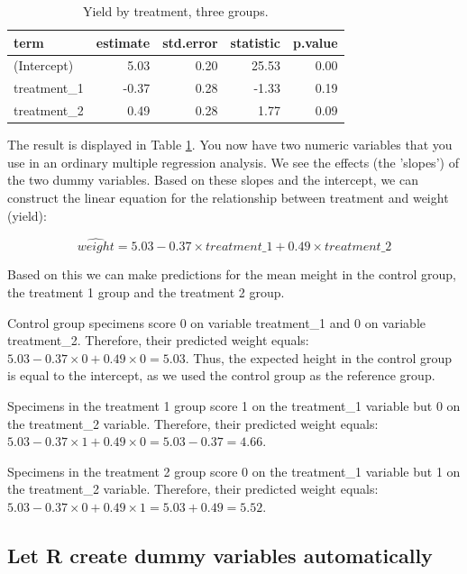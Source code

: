 \documentclass[]{book}\usepackage[]{graphicx}\usepackage[]{color}
\begin{document}
\begin{table}[ht]
\centering
\caption{Yield by treatment, three groups.} 
\label{tab:dummy_11_r}
\begin{tabular}{lrrrr}
  \hline
term & estimate & std.error & statistic & p.value \\ 
  \hline
(Intercept) & 5.03 & 0.20 & 25.53 & 0.00 \\ 
  treatment\_1 & -0.37 & 0.28 & -1.33 & 0.19 \\ 
  treatment\_2 & 0.49 & 0.28 & 1.77 & 0.09 \\ 
   \hline
\end{tabular}
\end{table}



The result is displayed in Table \ref{tab:dummy_11_r}. You now have two numeric variables that you use in an ordinary multiple regression analysis. We see the effects (the 'slopes') of the two dummy variables. Based on these slopes and the intercept, we can construct the linear equation for the relationship between treatment and weight (yield):


\begin{equation}
\widehat{weight} = 5.03 - 0.37 \times treatment\_1 + 0.49 \times treatment\_2
\end{equation}

Based on this we can make predictions for the mean meight in the control group, the treatment 1 group and the treatment 2 group.

Control group specimens score 0 on variable treatment\_1 and 0 on variable treatment\_2. Therefore, their predicted weight equals: $5.03 - 0.37 \times 0 + 0.49 \times 0 =  5.03$. Thus, the expected height in the control group is equal to the intercept, as we used the control group as the reference group.

Specimens in the treatment 1 group score 1 on the treatment\_1 variable but 0 on the treatment\_2 variable. Therefore, their predicted weight equals: $5.03 - 0.37 \times 1 + 0.49 \times 0  =  5.03 - 0.37   = 4.66$.

Specimens in the treatment 2 group score 0 on the treatment\_1 variable but 1 on the treatment\_2 variable. Therefore, their predicted weight equals: $5.03 - 0.37 \times 0 + 0.49 \times 1 = 5.03 + 0.49 = 5.52$.


\subsection{Let R create dummy variables automatically}
\end{document}
